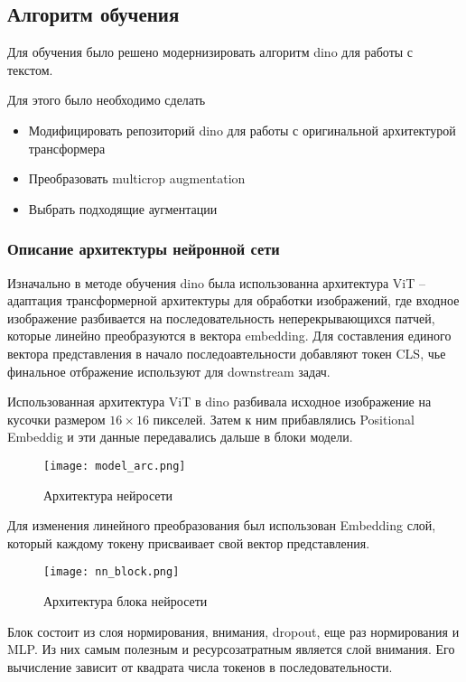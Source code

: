 \documentclass[../part_2.tex]{subfiles}
\begin{document}
    \subsection{Алгоритм обучения}
    \par Для обучения было решено модернизировать алгоритм dino для работы с текстом.
    \par Для этого было необходимо сделать
    \begin{itemize}
        \item Модифицировать репозиторий \acrshort{dino} для работы с оригинальной архитектурой трансформера
        \item Преобразовать multicrop augmentation
        \item Выбрать подходящие аугментации
    \end{itemize}
    \subsubsection{Описание архитектуры нейронной сети}
    \par Изначально в методе обучения \acrshort{dino} была использованна архитектура ViT -- адаптация трансформерной архитектуры для обработки изображений, где входное изображение разбивается на последовательность неперекрывающихся патчей, которые линейно преобразуются в вектора  embedding. Для составления единого вектора представления в начало последоавтельности добавляют токен CLS, чье финальное отбражение используют для downstream задач. 
    \par Использованная архитектура ViT в \acrshort{dino} разбивала исходное изображение на кусочки размером $16\times16$ пикселей. Затем к ним прибавлялись Positional Embeddig и эти данные передавались дальше в блоки модели.
    \begin{figure}[H]
        \centering
        \texttt{[image: model\_arc.png]}
        \caption{Архитектура нейросети}
        \label{fig:model_arc}
    \end{figure}
    \par Для изменения линейного преобразования был использован Embedding слой, который каждому токену присваивает свой вектор представления.
    \begin{figure}[H]
        \centering
        \texttt{[image: nn\_block.png]}
        \caption{Архитектура блока нейросети}
        \label{fig:nn_block}
    \end{figure}
    \par Блок состоит из слоя нормирования, внимания, dropout, еще раз нормирования и MLP. Из них самым полезным и ресурсозатратным является слой внимания. Его вычисление зависит от квадрата числа токенов в последовательности.
\end{document}
